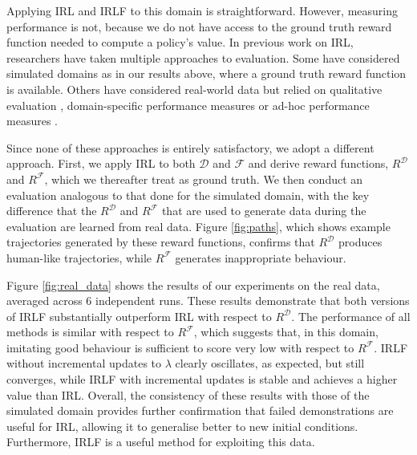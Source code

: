 \documentclass[letterpaper]{article}
\begin{document}
Applying IRL and IRLF to this domain is straightforward.  However, measuring performance is not, because we do not have access to the ground truth reward function needed to compute a policy's value. In previous work on IRL, researchers have taken multiple approaches to evaluation.  Some have considered simulated domains \cite{levine2011nonlinear,syed2007game,rothkopf2011preference} as in our results above, where a ground truth reward function is available. Others have considered real-world data but relied on qualitative evaluation \cite{ratliff2006maximum}, domain-specific performance measures \cite{neu2009training} or ad-hoc performance measures \cite{vasquez2014inverse}.

Since none of these approaches is entirely satisfactory, we adopt a different approach. First, we apply IRL to both $\mathcal{D}$ and $\mathcal{F}$ and derive reward functions, $R^{\mathcal{D}}$ and $R^{\mathcal{F}}$, which we thereafter treat as ground truth. We then conduct an evaluation analogous to that done for the simulated domain, with the key difference that the $R^{\mathcal{D}}$ and $R^{\mathcal{F}}$ that are used to generate data during the evaluation are learned from real data. Figure \ref{fig:paths}, which shows example trajectories generated by these reward functions, confirms that $R^{\mathcal{D}}$ produces human-like trajectories, while $R^{\mathcal{F}}$ generates inappropriate behaviour.

Figure \ref{fig:real_data} shows the results of our experiments on the real data, averaged across 6 independent runs. These results demonstrate that both versions of IRLF substantially outperform IRL with respect to $R^{\mathcal{D}}$.  The performance of all methods is similar with respect to $R^{\mathcal{F}}$, which suggests that, in this domain, imitating good behaviour is sufficient to score very low with respect to $R^{\mathcal{F}}$.  IRLF without incremental updates to $\lambda$ clearly oscillates, as expected, but still converges, while IRLF with incremental updates is stable and achieves a higher value than IRL.
%
Overall, the consistency of these results with those of the simulated domain provides further confirmation that failed demonstrations are useful for IRL, allowing it to generalise better to new initial conditions.  Furthermore, IRLF is a useful method for exploiting this data.
\end{document}
